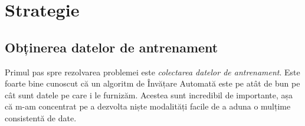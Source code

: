 







\section{Strategie}

\subsection{Obținerea datelor de antrenament}
Primul pas spre rezolvarea problemei este \emph{colectarea datelor de antrenament}.
Este foarte bine cunoscut că un algoritm de Învățare Automată este pe atât de bun pe cât sunt datele pe care i le furnizăm.
Acestea sunt incredibil de importante, așa că m-am concentrat pe a dezvolta niște modalități facile de a aduna o mulțime consistentă de date.

